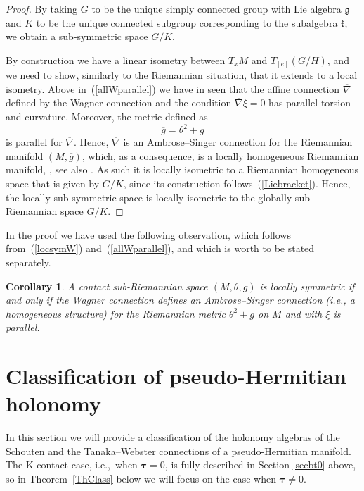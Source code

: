 \documentclass{amsart}
\theoremstyle{plain}
\newtheorem{cor}[theorem]{Corollary}
\theoremstyle{definition}
\newcommand{\bt}{{\boldsymbol{\tau}}}
\newcommand{\1}{\mathbf{1}}
\renewcommand{\k}{\mathfrak{k}}
\newcommand{\g}{\mathfrak{g}}
\newcommand{\+}{\oplus}
\newcommand{\bnab}{\overline{\nabla}}
\newcommand{\nbW}{\overline{\nabla}}
\newcommand{\acom}[1]{
 \marginpar{{\scriptsize A: #1 }}}
\begin{document}
\begin{proof}
By taking $G$ to be the unique simply connected group with Lie algebra $\g$ and $K$ to be the unique connected subgroup corresponding to the subalgebra $\k$, we obtain a sub-symmetric space $G/K$. 

By construction we have a linear isometry between $T_xM$ and $T_{[e]}(G/H)$, and we need to show, similarly to the Riemannian situation, that it extends to a local isometry.
Above in~(\ref{allWparallel})  we have in seen that  the affine connection $\nbW$ defined by the Wagner connection and the condition $\nbW\xi=0$ has parallel torsion and curvature. Moreover, the metric defined as
\[\overline{g}=\theta^2+ g\]
is parallel for $\bnab$. Hence, $\bnab$ is an Ambrose--Singer connection for the Riemannian manifold $(M,\overline{g})$, which, as a consequence, is a locally homogeneous Riemannian manifold, \cite{AmbroseSinger58}, see also 
\cite{tricerri-vanhecke83}. As such it is locally isometric to a Riemannian homogeneous space that is given by $G/K$, since its construction follows~(\ref{Liebracket}). 
Hence, the locally sub-symmetric space is locally isometric to the globally sub-Riemannian space $G/K$.
\end{proof}
In the proof we have used the following observation, which follows from~(\ref{locsymW}) and~(\ref{allWparallel}), and which is worth to be stated separately.
\begin{cor}
A contact sub-Riemannian space $(M,\theta, g)$ is locally symmetric if and only if 
the Wagner connection defines  an Ambrose--Singer connection (i.e., a homogeneous structure)  for the Riemannian metric $\theta^2+g$ on $M$ and with $\xi$ is parallel. 
\end{cor}


\section{Classification of pseudo-Hermitian holonomy} 
\label{SecClass} 
In this section we will provide a classification of the holonomy algebras of the Schouten and the Tanaka--Webster connections of a pseudo-Hermitian manifold. The K-contact case, i.e.,~when $\bt=0$, is fully described in  Section \ref{secbt0} above, so in Theorem~\ref{ThClass} below we will focus on the case when $\bt\not=0$. 
\end{document}
